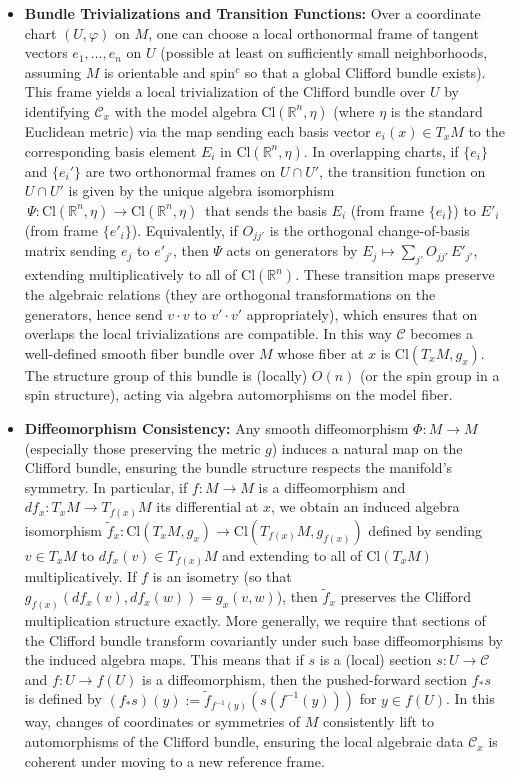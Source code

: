 \documentclass[12pt]{article}
\newcommand{\Cl}{\mathrm{Cl}}
\begin{document}
\begin{itemize}
    \item \textbf{Bundle Trivializations and Transition Functions:} Over a coordinate chart $(U, \varphi)$ on $M$, one can choose a local orthonormal frame of tangent vectors $e_1,\dots,e_n$ on $U$ (possible at least on sufficiently small neighborhoods, assuming $M$ is orientable and spin$^c$ so that a global Clifford bundle exists). This frame yields a local trivialization of the Clifford bundle over $U$ by identifying $\mathcal{C}_x$ with the model algebra $\Cl(\mathbb{R}^n, \eta)$ (where $\eta$ is the standard Euclidean metric) via the map sending each basis vector $e_i(x)\in T_x M$ to the corresponding basis element $E_i$ in $\Cl(\mathbb{R}^n,\eta)$. In overlapping charts, if $\{e_i\}$ and $\{e_i'\}$ are two orthonormal frames on $U \cap U'$, the transition function on $U \cap U'$ is given by the unique algebra isomorphism $\,\Psi: \Cl(\mathbb{R}^n,\eta) \to \Cl(\mathbb{R}^n,\eta)\,$ that sends the basis $E_i$ (from frame $\{e_i\}$) to $E'_i$ (from frame $\{e'_i\}$). Equivalently, if $O_{jj'}$ is the orthogonal change-of-basis matrix sending $e_j$ to $e'_{j'}$, then $\Psi$ acts on generators by $E_j \mapsto \sum_{j'} O_{jj'}\, E'_{j'}$, extending multiplicatively to all of $\Cl(\mathbb{R}^n)$. These transition maps preserve the algebraic relations (they are orthogonal transformations on the generators, hence send $v\cdot v$ to $v'\cdot v'$ appropriately), which ensures that on overlaps the local trivializations are compatible. In this way $\mathcal{C}$ becomes a well-defined smooth fiber bundle over $M$ whose fiber at $x$ is $\Cl(T_x M, g_x)$. The structure group of this bundle is (locally) $O(n)$ (or the spin group in a spin structure), acting via algebra automorphisms on the model fiber.

    \item \textbf{Diffeomorphism Consistency:} Any smooth diffeomorphism $\Phi: M \to M$ (especially those preserving the metric $g$) induces a natural map on the Clifford bundle, ensuring the bundle structure respects the manifold's symmetry. In particular, if $f: M \to M$ is a diffeomorphism and $df_x: T_x M \to T_{f(x)}M$ its differential at $x$, we obtain an induced algebra isomorphism $\tilde{f}_x: \Cl(T_x M, g_x) \to \Cl(T_{f(x)}M, g_{f(x)})$ defined by sending $v \in T_x M$ to $df_x(v) \in T_{f(x)}M$ and extending to all of $\Cl(T_x M)$ multiplicatively. If $f$ is an isometry (so that $g_{f(x)}(df_x(v), df_x(w)) = g_x(v,w)$), then $\tilde{f}_x$ preserves the Clifford multiplication structure exactly. More generally, we require that sections of the Clifford bundle transform covariantly under such base diffeomorphisms by the induced algebra maps. This means that if $s$ is a (local) section $s: U \to \mathcal{C}$ and $f: U \to f(U)$ is a diffeomorphism, then the pushed-forward section $f_* s$ is defined by $(f_* s)(y) := \tilde{f}_{f^{-1}(y)}(s(f^{-1}(y)))$ for $y \in f(U)$. In this way, changes of coordinates or symmetries of $M$ consistently lift to automorphisms of the Clifford bundle, ensuring the local algebraic data $\mathcal{C}_x$ is coherent under moving to a new reference frame.
\end{itemize}
\end{document}
